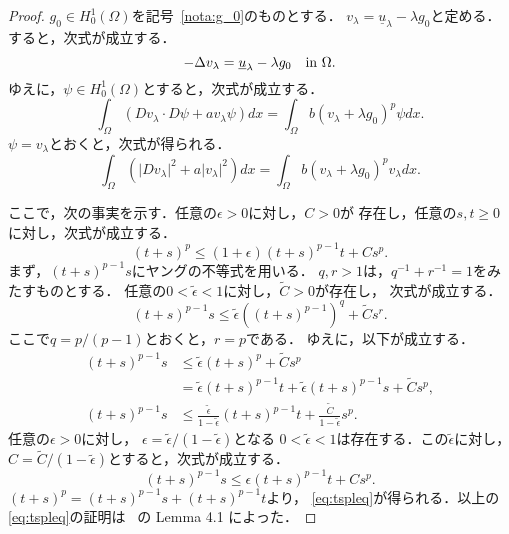 \begin{proof}
 $g_0 \in H_0^1(\Omega)$を記号~\ref{nota:g_0}のものとする．
 $v_\lambda = \underline{u}_\lambda - \lambda g_0$と定める．
 すると，次式が成立する．
 \[
  -\Delta v_\lambda = \underline{u}_\lambda - \lambda g_0 \ \ ~\text{in}~ \Omega.
 \]
 ゆえに，$\psi \in H_0^1(\Omega)$とすると，次式が成立する．
 \[
  \int_\Omega (Dv_\lambda \cdot D\psi + a v_\lambda \psi) dx =
 \int_\Omega b(v_\lambda + \lambda g_0)^p \psi dx.
 \]
 $\psi = v_\lambda$とおくと，次式が得られる．
 \begin{equation}
  \int_\Omega \left( \lvert Dv_\lambda \rvert^2 + a \lvert v_\lambda
               \rvert^2 \right) dx =
  \int_\Omega b(v_\lambda + \lambda g_0)^p v_\lambda dx. \label{eq:v_lambda}
 \end{equation}

 ここで，次の事実を示す．任意の$\epsilon > 0$に対し，$C > 0$が
 存在し，任意の$s, t \geq 0$に対し，次式が成立する．
 \begin{equation}
  (t+s)^p \leq (1 + \epsilon) (t+s)^{p-1} t + C s^p. \label{eq:tspleq}
 \end{equation}
 まず，$(t+s)^{p-1}s$にヤングの不等式を用いる．
 $q, r > 1$は，$q^{-1} + r^{-1} = 1$をみたすものとする．
 任意の$0 < \tilde{\epsilon} < 1$に対し，$\tilde{C} > 0$が存在し，
 次式が成立する．
 \[
  (t+s)^{p-1} s \leq \tilde{\epsilon} \left( (t+s)^{p-1} \right)^q +
 \tilde{C} s^r.
 \]
 ここで$q = p/(p-1)$とおくと，$r = p$である．
 ゆえに，以下が成立する．
 \begin{align*}
  (t+s)^{p-1} s & \leq \tilde{\epsilon} (t+s)^p + \tilde{C} s^p \\
  &= \tilde{\epsilon} (t+s)^{p-1} t + \tilde{\epsilon} (t+s)^{p-1} s 
  + \tilde{C} s^p, \\
  (t+s)^{p-1} s &\leq \frac{\tilde{\epsilon}}{1 - \tilde{\epsilon}}
  (t+s)^{p-1} t + \frac{\tilde{C}}{1 - \tilde{\epsilon}} s^p.
 \end{align*}
 任意の$\epsilon > 0$に対し，
 $\epsilon = \tilde{\epsilon} / (1 - \tilde{\epsilon})$となる
 $0 < \tilde{\epsilon} < 1$は存在する．この$\tilde{\epsilon}$に対し，
 $C = \tilde{C}/ (1 - \tilde{\epsilon})$とすると，次式が成立する．
 \[
  (t+s)^{p-1} s \leq \epsilon (t+s)^{p-1} t + Cs^p.
 \]
 $(t+s)^{p} = (t+s)^{p-1} s + (t+s)^{p-1}t$より，
 \eqref{eq:tspleq}が得られる．以上の\eqref{eq:tspleq}の証明は
 \cite{MR2317491}~の Lemma 4.1 によった．


\end{proof}
